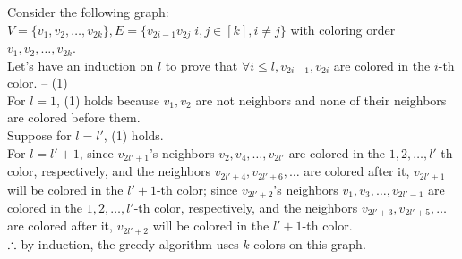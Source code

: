 \setcounter{pr}{0}
\begin{pr}
Consider the following graph:\\
$V=\{v_1, v_2, \dots, v_{2k}\}, E=\{v_{2i-1}v_{2j}|i, j\in[k], i\neq j\}$ with coloring order $v_1, v_2, \dots, v_{2k}$.\\
Let's have an induction on $l$ to prove that $\forall i\leq l, v_{2i-1}, v_{2i}$ are colored in the $i$-th color. -- (1)\\
For $l=1$, (1) holds because $v_1, v_2$ are not neighbors and none of their neighbors are colored before them.\\
Suppose for $l=l'$, (1) holds.\\
For $l=l'+1$, since $v_{2l'+1}$'s neighbors $v_2, v_4, \dots, v_{2l'}$ are colored in the $1, 2, \dots, l'$-th color, respectively, and the neighbors $v_{2l'+4}, v_{2l'+6}, \dots$ are colored after it, $v_{2l'+1}$ will be colored in the $l'+1$-th color; since $v_{2l'+2}$'s neighbors $v_1, v_3, \dots, v_{2l'-1}$ are colored in the $1, 2, \dots, l'$-th color, respectively, and the neighbors $v_{2l'+3}, v_{2l'+5}, \dots$ are colored after it, $v_{2l'+2}$ will be colored in the $l'+1$-th color.\\
$\therefore$ by induction, the greedy algorithm uses $k$ colors on this graph.
\end{pr}

